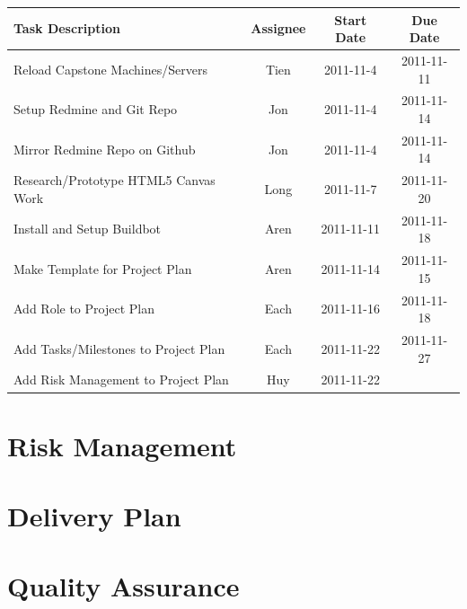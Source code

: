 \documentclass[12pt, letterpaper]{article}
\begin{document}
  \begin{center}
    \begin{tabular}{| l || c | c | c | }
      \hline
      Task Description & Assignee & Start Date & Due Date \\
      \hline
			Reload Capstone Machines/Servers & Tien & 2011-11-4 & 2011-11-11\\
			Setup Redmine and Git Repo & Jon & 2011-11-4 & 2011-11-14 \\
			Mirror Redmine Repo on Github & Jon & 2011-11-4 & 2011-11-14 \\
			Research/Prototype HTML5 Canvas Work & Long & 2011-11-7 & 2011-11-20 \\
      Install and Setup Buildbot & Aren & 2011-11-11 & 2011-11-18 \\
      Make Template for Project Plan & Aren & 2011-11-14 & 2011-11-15 \\
			Add Role to Project Plan & Each & 2011-11-16 & 2011-11-18 \\
			Add Tasks/Milestones to Project Plan & Each & 2011-11-22 & 2011-11-27\\
			Add Risk Management to Project Plan & Huy & 2011-11-22 & \\
      \hline
    \end{tabular}
  \end{center}

\section{Risk Management}

\section{Delivery Plan}

\section{Quality Assurance}
\end{document}
